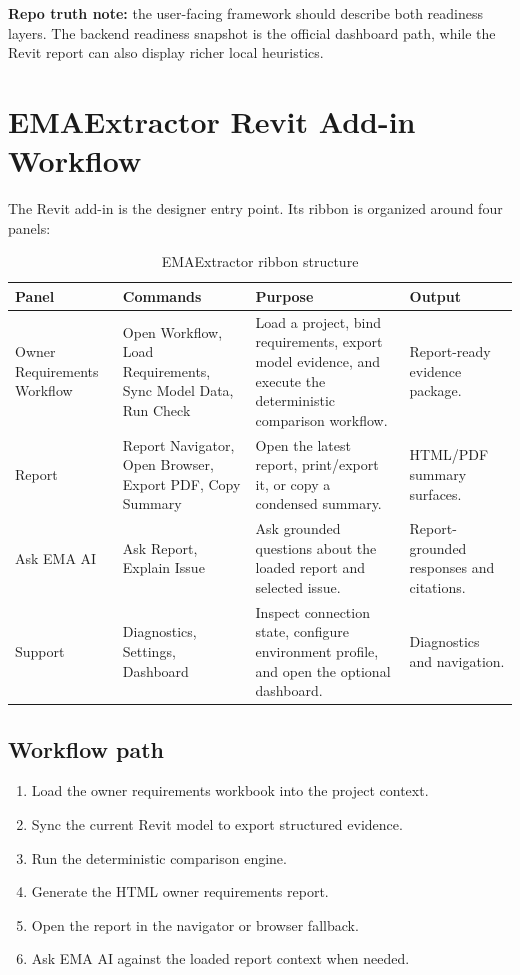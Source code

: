 \documentclass[10pt,letterpaper]{article}
\newcommand{\strong}[1]{\textbf{\textcolor{emaNavy}{#1}}}
\newcommand{\keyconcept}[1]{%
\begin{tcolorbox}[colback=emaSoft,borderline west={3pt}{0pt}{emaBlue}]
\small #1
\end{tcolorbox}}
\begin{document}
\keyconcept{\strong{Repo truth note:} the user-facing framework should describe both readiness layers. The backend readiness snapshot is the official dashboard path, while the Revit report can also display richer local heuristics.}

\section{EMAExtractor Revit Add-in Workflow}

The Revit add-in is the designer entry point. Its ribbon is organized around four panels:

\begin{table}[!h]
\centering
\small
\caption{EMAExtractor ribbon structure}\label{tab:ribbon}
\begin{tabularx}{\linewidth}{p{1.55in}p{1.7in}>{\raggedright\arraybackslash}X p{1.45in}}
\toprule
\textbf{Panel} & \textbf{Commands} & \textbf{Purpose} & \textbf{Output} \\
\midrule
Owner Requirements Workflow & Open Workflow, Load Requirements, Sync Model Data, Run Check & Load a project, bind requirements, export model evidence, and execute the deterministic comparison workflow. & Report-ready evidence package. \\
Report & Report Navigator, Open Browser, Export PDF, Copy Summary & Open the latest report, print/export it, or copy a condensed summary. & HTML/PDF summary surfaces. \\
Ask EMA AI & Ask Report, Explain Issue & Ask grounded questions about the loaded report and selected issue. & Report-grounded responses and citations. \\
Support & Diagnostics, Settings, Dashboard & Inspect connection state, configure environment profile, and open the optional dashboard. & Diagnostics and navigation. \\
\bottomrule
\end{tabularx}
\end{table}

\subsection{Workflow path}

\begin{enumerate}
  \item Load the owner requirements workbook into the project context.
  \item Sync the current Revit model to export structured evidence.
  \item Run the deterministic comparison engine.
  \item Generate the HTML owner requirements report.
  \item Open the report in the navigator or browser fallback.
  \item Ask EMA AI against the loaded report context when needed.
\end{enumerate}
\end{document}
